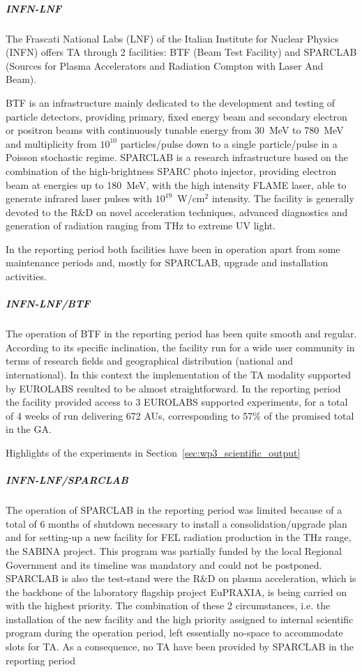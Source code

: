 
\subparagraph{INFN-LNF}

The Frascati National Labs (LNF) of the Italian Institute for Nuclear Physics (INFN) offers TA through 2 facilities: BTF (Beam Test Facility) and SPARCLAB (Sources for Plasma Accelerators and Radiation Compton with Laser And Beam).

BTF is an infrastructure mainly dedicated to the development and testing of particle detectors, providing primary, fixed energy beam and secondary electron or positron beams with continuously tunable energy from \SI{30}{\MeV} to \SI{780}{\MeV} and multiplicity from $10^{10}$ particles/pulse down to a single particle/pulse in a Poisson stochastic regime.
SPARCLAB is a research infrastructure based on the combination of the high-brightness SPARC photo injector, providing electron beam at energies up to \SI{180}{\MeV}, with the high intensity FLAME laser, able to generate infrared laser pulses with $10^{19}$~W/cm$^2$ intensity. The facility is generally devoted to the R\&D on novel acceleration techniques, advanced diagnostics and generation of radiation ranging from THz to extreme UV light. 

In the reporting period both facilities have been in operation apart from some maintenance periods and, mostly for SPARCLAB, upgrade and installation activities.

\subparagraph{INFN-LNF/BTF}

The operation of BTF in the reporting period has been quite smooth and regular. According to its specific inclination, the facility run for a wide user community in terms of research fields and geographical distribution (national and international). In this context the implementation of the TA modality supported by EUROLABS resulted to be almost straightforward. In the reporting period the facility provided access to 3 EUROLABS supported experiments, for a total of 4 weeks of run delivering 672 AUs, corresponding to 57\% of the promised total in the GA. 

Highlights of the experiments in Section~\ref{sec:wp3_scientific_output}

\subparagraph{INFN-LNF/SPARCLAB}

The operation of SPARCLAB in the reporting period was limited because of a total of 6 months of shutdown necessary to install a consolidation/upgrade plan and for setting-up a new facility for FEL radiation production in the THz range, the SABINA project. This program was partially funded by the local Regional Government and its timeline was mandatory and could not be postponed. SPARCLAB is also the test-stand were the R\&D on plasma acceleration, which is the backbone of the laboratory flagship project EuPRAXIA, is being carried on with the highest priority. The combination of these 2 circumstances, i.e. the installation of the new facility and the high priority assigned to internal scientific program during the operation period, left essentially no-space to accommodate slots for TA. As a consequence, no TA have been provided by SPARCLAB in the reporting period

